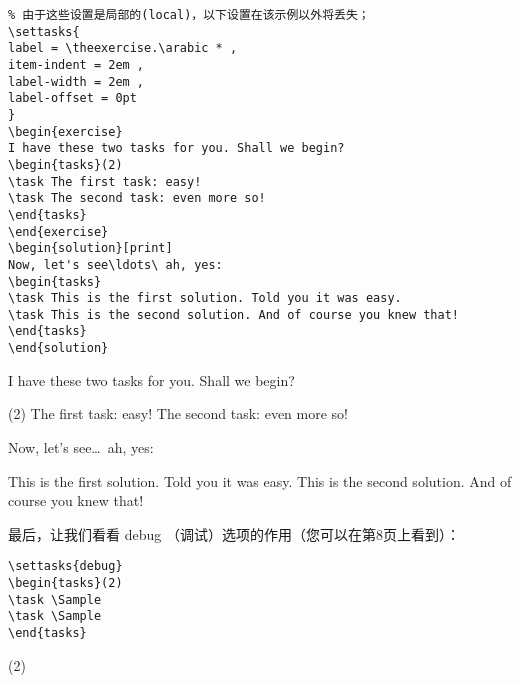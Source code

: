 \documentclass[a4paper,12pt,indent]{article}
\begin{document}
\begin{tcolorbox}[collower=black,colframe=Tasks,colback=white]
    \begin{lstlisting}
% 由于这些设置是局部的(local)，以下设置在该示例以外将丢失；
\settasks{
label = \theexercise.\arabic * ,
item-indent = 2em ,
label-width = 2em ,
label-offset = 0pt
}
\begin{exercise}
I have these two tasks for you. Shall we begin?
\begin{tasks}(2)
\task The first task: easy!
\task The second task: even more so!
\end{tasks}
\end{exercise}
\begin{solution}[print]
Now, let's see\ldots\ ah, yes:
\begin{tasks}
\task This is the first solution. Told you it was easy.
\task This is the second solution. And of course you knew that!
\end{tasks}
\end{solution}
\end{lstlisting}
        \tcblower
    I have these two tasks for you. Shall we begin?
    \begin{tasks}[style=enumerate](2)
    \task The first task: easy!
    \task The second task: even more so!
    \end{tasks}

    Now, let's see\ldots\ ah, yes:
    \begin{tasks}[style=enumerate]
    \task This is the first solution. Told you it was easy.
    \task This is the second solution. And of course you knew that!
    \end{tasks}
           \end{tcolorbox}


最后，让我们看看 debug （调试）选项的作用（您可以在第8页上看到）：

\begin{tcolorbox}[collower=black,colframe=Tasks,colback=white]
    \begin{lstlisting}
\settasks{debug}
\begin{tasks}(2)
\task \Sample
\task \Sample
\end{tasks}
\end{lstlisting}
        \tcblower
        \begin{tasks}(2)
        \task \Sample
        \task \Sample
        \end{tasks}
           \end{tcolorbox}
\end{document}
